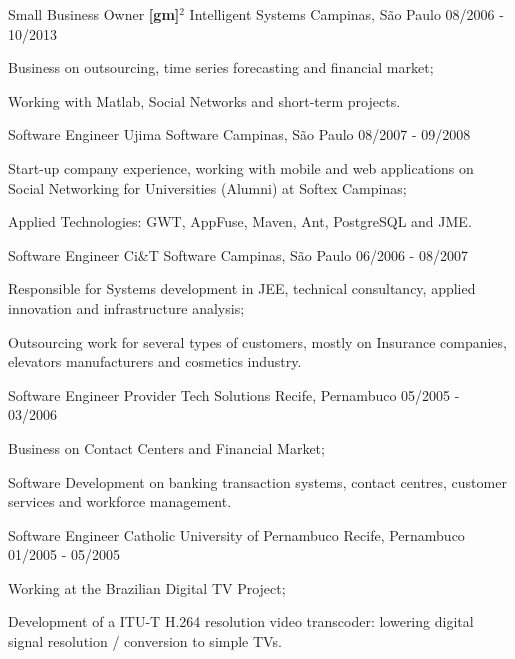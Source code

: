 \begin{cventries}

\cventry
{Small Business Owner}
{\textbf{[gm]}$^2$ Intelligent Systems}
{Campinas, São Paulo}
{08/2006 - 10/2013}
{
\begin{cvitems}
\item Business on outsourcing, time series forecasting and financial market;
\item Working with Matlab, Social Networks and short-term projects.
\end{cvitems}
}

\cventry
{Software Engineer}
{Ujima Software}
{Campinas, São Paulo}
{08/2007 - 09/2008}
{
\begin{cvitems}
\item Start-up company experience, working with mobile and web applications on Social Networking for Universities (Alumni) at Softex Campinas;
\item Applied Technologies: GWT, AppFuse, Maven, Ant, PostgreSQL and JME.
\end{cvitems}
}

\cventry
{Software Engineer}
{Ci\&T Software}
{Campinas, São Paulo}
{06/2006 - 08/2007}
{
\begin{cvitems}
\item Responsible for Systems development in JEE, technical consultancy, applied innovation and infrastructure analysis;
\item Outsourcing work for several types of customers, mostly on Insurance companies, elevators manufacturers and cosmetics industry.
\end{cvitems}
}

\cventry
{Software Engineer}
{Provider Tech Solutions}
{Recife, Pernambuco}
{05/2005 - 03/2006}
{
\begin{cvitems}
\item Business on Contact Centers and Financial Market;
\item Software Development on banking transaction systems, contact centres, customer services and workforce management.
\end{cvitems}
}

\cventry
{Software Engineer}
{Catholic University of Pernambuco}
{Recife, Pernambuco}
{01/2005 - 05/2005}
{
\begin{cvitems}
\item Working at the Brazilian Digital TV Project;
\item Development of a ITU-T H.264 resolution video transcoder: lowering digital signal resolution / conversion to simple TVs.
\end{cvitems}
}


\end{cventries}
